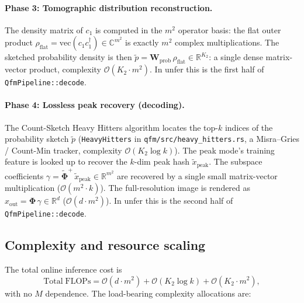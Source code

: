 \documentclass[11pt, a4paper]{article}
\newcommand{\Rset}{\mathbb{R}}
\newcommand{\Cset}{\mathbb{C}}
\begin{document}
\paragraph{Phase 3: Tomographic distribution reconstruction.} The density
matrix of $c_1$ is computed in the $m^2$ operator basis: the flat outer
product $\rho_{\mathrm{flat}}=\mathrm{vec}(c_1c_1^\dagger)\in\Cset^{m^2}$ is
exactly $m^2$ complex multiplications. The sketched probability density is
then $\tilde p=\mathbf{W}_{\mathrm{prob}}\,\rho_{\mathrm{flat}}\in\Rset^{K_2}$:
a single dense matrix-vector product, complexity $\mathcal{O}(K_2\cdot m^2)$.
In unfer this is the first half of \texttt{QfmPipeline::decode}.

\paragraph{Phase 4: Lossless peak recovery (decoding).} The Count-Sketch
Heavy Hitters algorithm locates the top-$k$ indices of the probability sketch
$\tilde p$ (\texttt{HeavyHitters} in \texttt{qfm/src/heavy\_hitters.rs}, a
Misra--Gries / Count-Min tracker, complexity $\mathcal{O}(K_2\log k)$). The
peak mode's training feature is looked up to recover the $k$-dim peak hash
$\tilde x_{\mathrm{peak}}$. The subspace coefficients
$\gamma=\tilde{\mathbf\Phi}^+\,\tilde x_{\mathrm{peak}}\in\Rset^{m^2}$ are
recovered by a single small matrix-vector multiplication
($\mathcal{O}(m^2\cdot k)$). The full-resolution image is rendered as
$x_{\mathrm{out}}=\mathbf\Phi\,\gamma\in\Rset^d$ ($\mathcal{O}(d\cdot m^2)$).
In unfer this is the second half of \texttt{QfmPipeline::decode}.

\subsection{Complexity and resource scaling}

The total online inference cost is
\begin{equation}
  \mathrm{Total\;FLOPs}=\mathcal{O}(d\cdot m^2)+\mathcal{O}(K_2\log k)
  +\mathcal{O}(K_2\cdot m^2),
\end{equation}
with no $M$ dependence. The load-bearing complexity allocations are:
\end{document}

